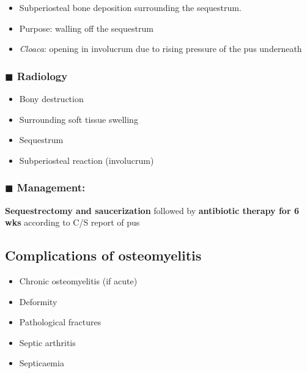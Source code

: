 \documentclass[
  14pt,
]{memoir}
\providecommand{\tightlist}{%
  \setlength{\itemsep}{0pt}\setlength{\parskip}{0pt}}
\begin{document}
\begin{itemize}
\tightlist
\item
  Subperiosteal bone deposition surrounding the sequestrum.
\item
  Purpose: walling off the sequestrum
\item
  \emph{Cloaca}: opening in involucrum due to rising pressure of the pus
  underneath
\end{itemize}

\hypertarget{blacksquare-radiology-1}{%
\subsubsection{\texorpdfstring{\(\blacksquare\)
Radiology}{\textbackslash blacksquare Radiology}}\label{blacksquare-radiology-1}}

\begin{itemize}
\tightlist
\item
  Bony destruction
\item
  Surrounding soft tissue swelling
\item
  Sequestrum
\item
  Subperiosteal reaction (involucrum)
\end{itemize}

\hypertarget{blacksquare-management}{%
\subsubsection{\texorpdfstring{\(\blacksquare\)
Management:}{\textbackslash blacksquare Management:}}\label{blacksquare-management}}

\textbf{Sequestrectomy and saucerization} followed by \textbf{antibiotic
therapy for 6 wks} according to C/S report of pus

\hypertarget{complications-of-osteomyelitis}{%
\subsection{Complications of
osteomyelitis}\label{complications-of-osteomyelitis}}

\begin{itemize}
\tightlist
\item
  Chronic osteomyelitis (if acute)
\item
  Deformity
\item
  Pathological fractures
\item
  Septic arthritis
\item
  Septicaemia
\end{itemize}
\end{document}
